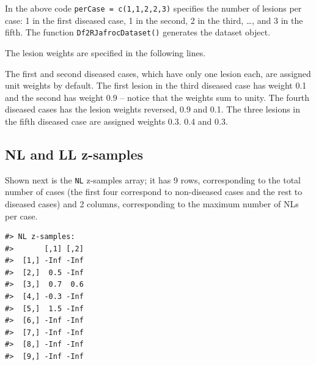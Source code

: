 \documentclass[
]{book}
\newenvironment{Shaded}{\begin{snugshade}}{\end{snugshade}}
\newcommand{\DecValTok}[1]{\textcolor[rgb]{0.00,0.00,0.81}{#1}}
\newcommand{\FloatTok}[1]{\textcolor[rgb]{0.00,0.00,0.81}{#1}}
\newcommand{\KeywordTok}[1]{\textcolor[rgb]{0.13,0.29,0.53}{\textbf{#1}}}
\newcommand{\NormalTok}[1]{#1}
\newcommand{\OperatorTok}[1]{\textcolor[rgb]{0.81,0.36,0.00}{\textbf{#1}}}
\newcommand{\OtherTok}[1]{\textcolor[rgb]{0.56,0.35,0.01}{#1}}
\newcommand{\StringTok}[1]{\textcolor[rgb]{0.31,0.60,0.02}{#1}}
\begin{document}
In the above code \texttt{perCase\ =\ c(1,1,2,2,3)} specifies the number of lesions per case: 1 in the first diseased case, 1 in the second, 2 in the third, \ldots, and 3 in the fifth. The function \texttt{Df2RJafrocDataset()} generates the dataset object.

The lesion weights are specified in the following lines.

\begin{Shaded}
\end{Shaded}

The first and second diseased cases, which have only one lesion each, are assigned unit weights by default. The first lesion in the third diseased case has weight 0.1 and the second has weight 0.9 -- notice that the weights sum to unity. The fourth diseased cases has the lesion weights reversed, 0.9 and 0.1. The three lesions in the fifth diseased case are assigned weights 0.3. 0.4 and 0.3.

\hypertarget{nl-and-ll-z-samples}{%
\subsection{NL and LL z-samples}\label{nl-and-ll-z-samples}}

Shown next is the \texttt{NL} z-samples array; it has 9 rows, corresponding to the total number of cases (the first four correspond to non-diseased cases and the rest to diseased cases) and 2 columns, corresponding to the maximum number of NLs per case.

\begin{verbatim}
#> NL z-samples:
#>       [,1] [,2]
#>  [1,] -Inf -Inf
#>  [2,]  0.5 -Inf
#>  [3,]  0.7  0.6
#>  [4,] -0.3 -Inf
#>  [5,]  1.5 -Inf
#>  [6,] -Inf -Inf
#>  [7,] -Inf -Inf
#>  [8,] -Inf -Inf
#>  [9,] -Inf -Inf
\end{verbatim}
\end{document}
